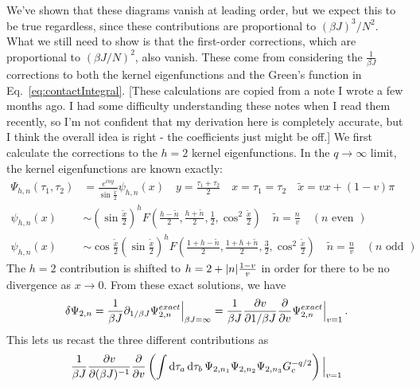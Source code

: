 \documentclass[aps,prx,preprint,onecolumn,citeautoscript,footinbib]{revtex4-1}
\renewcommand{\tilde}{\widetilde}
\newcommand{\note}[1]{{\color{red}[#1]}}
\begin{document}
We've shown that these diagrams vanish at leading order, but we expect this to be true regardless, since these contributions are proportional to $(\beta J)^3/N^2$. What we still need to show is that the first-order corrections, which are proportional to $(\beta J/N)^2$, also vanish. These come from considering the $\frac{1}{\beta J}$ corrections to both the kernel eigenfunctions and the Green's function in Eq.~\ref{eq:contactIntegral}.  \note{These calculations are copied from a note I wrote a few months ago. I had some difficulty understanding these notes when I read them recently, so I'm not confident that my derivation here is completely accurate, but I think the overall idea is right - the coefficients just might be off.}  We first calculate the corrections to the $h=2$ kernel eigenfunctions. In the $q \rightarrow \infty$ limit, the kernel eigenfunctions are known exactly:
\begin{equation}
    \begin{aligned}
        \Psi_{h, n}(\tau_1, \tau_2) &= \frac{e^{iny}}{\sin\frac{\tilde{x}}{2}} \psi_{h, n}(x) \quad y = \frac{\tau_1 + \tau_2}{2} \quad x = \tau_1 = \tau_2 \quad \tilde{x} = v x + (1-v)\pi
  \\
  \psi_{h,n}(x) &\sim \left( \sin\frac{\tilde{x}}{2} \right)^h F\left( \frac{h-\tilde{n}}{2}, \frac{h + \tilde{n}}{2}, \frac{1}{2}, \cos^2\frac{\tilde{x}}{2} \right) \quad \tilde{n} = \frac{n}{v} \quad (n \text{ even })
  \\
  \psi_{h,n}(x) &\sim \cos \frac{\tilde{x}}{2} \left( \sin\frac{\tilde{x}}{2} \right)^h F\left( \frac{1+h-\tilde{n}}{2}, \frac{1+h + \tilde{n}}{2}, \frac{3}{2}, \cos^2\frac{\tilde{x}}{2} \right) \quad \tilde{n} = \frac{n}{v} \quad (n \text{ odd })\end{aligned}
\end{equation}
The $h=2$ contribution is shifted to $h=2 + \abs{n} \frac{1-v}{v}$ in order for there to be no divergence as $x \rightarrow 0$.
From these exact solutions, we have
\begin{equation}
    \delta \Psi_{2, n} = \frac{1}{\beta J} \partial_{1/\beta J} \Psi^{exact}_{2,n}\Big|_{\beta J = \infty} = \frac{1}{\beta J} \pdv{v}{1/\beta J} \pdv{v} \Psi^{exact}_{2,n}\Big|_{v=1}\,.
\end{equation}
This lets us recast the three different contributions as
\begin{equation}
    \frac{1}{\beta J} \pdv{v}{(\beta J)^{-1}} \pdv{v}\left( \int \dd{\tau_a} \dd{\tau_b}   \Psi_{2, n_1} \Psi_{2, n_2}\Psi_{2, n_3} G_c^{-q/2}\right) \Big|_{v=1}
\end{equation}
\end{document}
